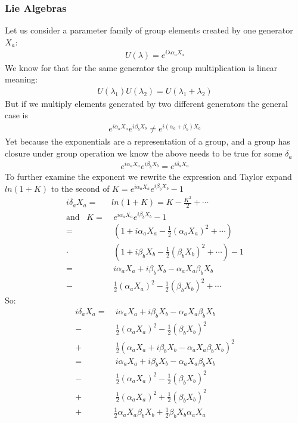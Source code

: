 \documentclass[a4paper]{article}
\theoremstyle{definition}
\theoremstyle{definition}
\theoremstyle{definition}
\theoremstyle{theorem}
\theoremstyle{theorem}
\theoremstyle{theorem}
\theoremstyle{definition}
\begin{document}
\subsubsection{Lie Algebras}
    Let us consider a parameter family of group elements created by one generator $X_a$:
    \begin{align}
        U(\lambda) = e^{i\lambda \alpha _a X_a}
    \end{align}
    We know for that for the same generator the group multiplication is linear meaning:
    \begin{align}
        U(\lambda _1)U(\lambda _2) = U(\lambda_1 + \lambda_2)
    \end{align}
    But if we multiply elements generated by two different generators the general case is
    \begin{align}
        e^{i\alpha_a X_a} e^{i\beta_b X_b} \neq  e^{i (\alpha _a + \beta_b) X_a}
    \end{align}
    Yet because the exponentials are a representation of a group, and a group has closure under
    group operation we know the above needs to be true for some $\delta _a$
    \begin{align}
        e^{i\alpha_a X_a} e^{i\beta_b X_b} = e^{i \delta _a X_a}
    \end{align}
    To further examine the exponent we rewrite the expression and Taylor expand $ln(1+K)$
    to the second of $K = e^{i\alpha_a X_a} e^{i\beta_b X_b} -1$
    \begin{align}
        i\delta _a X_a =& ln(1 + K) = K - \frac{K^2}{2} + \cdots \\
        \text{and}\;\;\; K =&\ e^{i\alpha_a X_a} e^{i\beta_b X_b} -1 \\
          =&\ (1 + i\alpha _a X_a - \frac{1}{2}(\alpha _a X_a)^2 + \cdots) \\
          \cdot&\ (1 + i\beta _b X_b - \frac{1}{2}(\beta _b X_b)^2 + \cdots) -1 \\
          =&\ i\alpha _a X_a + i\beta _b X_b - \alpha_a X_a \beta _b X_b \\
          -&\ \frac{1}{2}(\alpha _a X_a)^2 - \frac{1}{2}(\beta _b X_b)^2 + \cdots
    \end{align}
    So:
    \begin{align}
        i\delta _a X_a =&\ i\alpha _a X_a + i\beta _b X_b - \alpha_a X_a \beta _b X_b \\
          -&\ \frac{1}{2}(\alpha _a X_a)^2 - \frac{1}{2}(\beta _b X_b)^2 \\
          +&\ \frac{1}{2}(\alpha _a X_a + i\beta _b X_b - \alpha_a X_a \beta _b X_b)^2 \\
          =&\ i\alpha _a X_a + i\beta _b X_b - \alpha_a X_a \beta _b X_b \\
          -&\ \frac{1}{2}(\alpha _a X_a)^2 - \frac{1}{2}(\beta _b X_b)^2  \\
          +&\ \frac{1}{2}(\alpha _a X_a)^2 + \frac{1}{2}(\beta _b X_b)^2 \\
          +& \frac{1}{2}\alpha _a X_a \beta _b X_b + \frac{1}{2}\beta _b X_b \alpha _a X_a
    \end{align}
\end{document}
